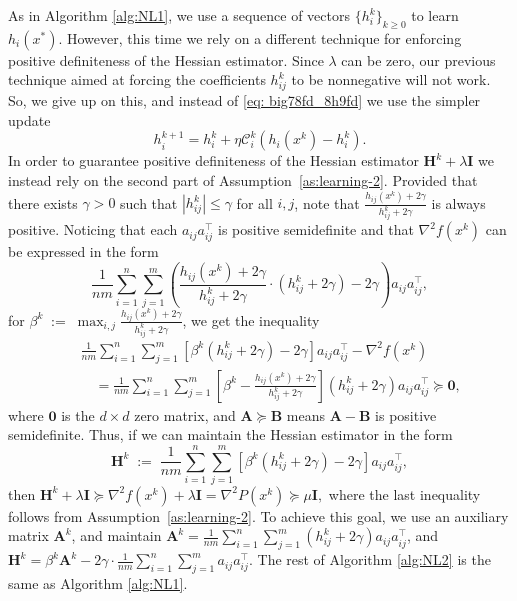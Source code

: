 \documentclass[12pt]{article}
\newcommand{\squeeze}{}
\newcommand{\eqdef}{\; { := }\;}
\newcommand{\newalpha}{h}
\newcommand{\mA}{\mathbf{A}}
\newcommand{\mB}{\mathbf{B}}
\newcommand{\mH}{\mathbf{H}}
\newcommand{\mI}{\mathbf{I}}
\newcommand{\cC}{{\mathcal{C}}}
\begin{document}
As in Algorithm \ref{alg:NL1}, we use a sequence of vectors $\{h_i^k\}_{k\geq 0}$ to learn $\newalpha_i(x^*)$. However, this 
time we rely on a different technique for enforcing positive definiteness of the Hessian estimator.  Since $\lambda$ can be zero, our previous technique aimed at forcing the coefficients $h_{ij}^k$ to be nonnegative will not work. So, we give up on this, 
and instead of \eqref{eq: big78fd_8h9fd} we use the simpler update 
\begin{equation}\label{eq:hikgeneral}
\boxed{\quad h^{k+1}_i = h^k_i + \eta \cC_i^k(\newalpha_i(x^k) - h^k_i). \quad}
\end{equation}
In order to guarantee positive definiteness of  the Hessian estimator $\mH^k + \lambda \mI$ we instead rely on the second part of Assumption~\ref{as:learning-2}. Provided that there exists $\gamma>0$ such that $|h_{ij}^k| \leq \gamma$ for all $i,j$, note that $\frac{\newalpha_{ij}(x^k) + 2\gamma}{h_{ij}^k + 2\gamma}$ is always positive. Noticing that each $a_{ij}a_{ij}^\top$ is positive semidefinite and that $\nabla^2 f(x^k)$ can be expressed in the form
$$
\squeeze \frac{1}{nm}\sum \limits_{i=1}^n \sum\limits_{j=1}^m \left( \frac{\newalpha_{ij}(x^k) + 2\gamma}{h_{ij}^k + 2\gamma} \cdot (h_{ij}^k + 2\gamma) - 2\gamma \right) a_{ij}a_{ij}^\top, 
$$
for  $\beta^k \eqdef \max_{i,j} \frac{\newalpha_{ij}(x^k) + 2\gamma}{h_{ij}^k + 2\gamma}$, we get the inequality
\begin{eqnarray*}
 &&\frac{1}{nm}\sum_{i=1}^n \sum_{j=1}^m \left[ \beta^k (h_{ij}^k + 2\gamma) - 2\gamma \right] a_{ij}a_{ij}^\top - \nabla^2 f(x^k)\\
&& \quad = \frac{1}{nm}\sum_{i=1}^n \sum_{j=1}^m \left[  \beta^k - \frac{\newalpha_{ij}(x^k) + 2\gamma}{h_{ij}^k + 2\gamma} \right] (h_{ij}^k + 2\gamma) a_{ij}a_{ij}^\top 
\succeq \mathbf{0},
\end{eqnarray*}
where $\mathbf{0}$ is the $d\times d$ zero matrix, and $\mA \succeq \mB$ means $\mA - \mB$ is positive semidefinite. Thus, if we can maintain the Hessian estimator in the form $$\squeeze \mH^k \eqdef \frac{1}{nm}\sum \limits_{i=1}^n \sum \limits_{j=1}^m \left[ \beta^k (h_{ij}^k + 2\gamma) - 2\gamma \right] a_{ij}a_{ij}^\top,$$ then 
$
\mH^k + \lambda \mI \succeq \nabla^2 f(x^k) + \lambda \mI = \nabla^2P(x^k) \succeq \mu \mI,
$
where the last inequality follows from Assumption~\ref{as:learning-2}. To achieve this goal, we use an auxiliary matrix $\mA^k$, and maintain $\mA^k = \frac{1}{nm} \sum_{i=1}^n \sum_{j=1}^{m}(h_{ij}^k + 2\gamma) a_{ij}a_{ij}^\top$, and $\mH^k = \beta^k \mA^k - 2\gamma \cdot\frac{1}{nm} \sum_{i=1}^n  \sum_{j=1}^{m}a_{ij}a_{ij}^\top$. The rest of Algorithm \ref{alg:NL2} is the same as Algorithm \ref{alg:NL1}. 
\end{document}

